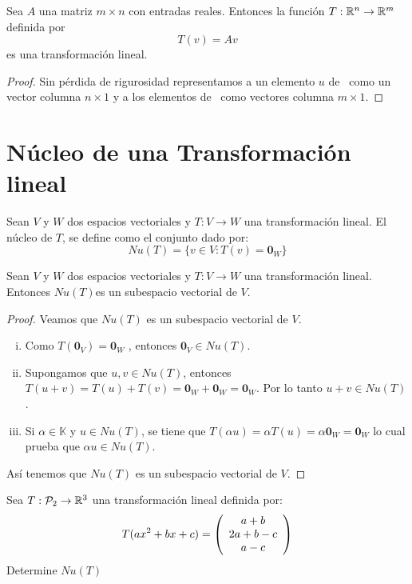 \begin{theorem}
Sea $A$ una matriz $m \times n$ con entradas reales. Entonces la función $T : \mathbb{R}^n \to \mathbb{R}^m $ definida por $$T(v)= A v$$
es una transformación lineal.
\end{theorem}

\begin{proof}
Sin pérdida de rigurosidad representamos a un elemento $u$ de \rn \ como un vector columna $n \times 1$ y a los elementos de \rmm \ como vectores columna $m \times 1$.
\end{proof}


\section{Núcleo de una Transformación lineal}
\begin{dfn}
Sean $V$ y $W$ dos espacios vectoriales y $T : V \to W$ una transformación lineal. El núcleo de $T$, se define como el conjunto dado por: 
$$Nu(T) = \{v \in V : T(v) = \mathbf{0}_W\}$$
\end{dfn}

\begin{theorem}
Sean $V$ y $W$ dos espacios vectoriales y $T : V \to W$ una transformación lineal. Entonces $Nu(T)$es un subespacio vectorial de $V$.
\end{theorem}

\begin{proof}
Veamos que $Nu(T)$ es un subespacio vectorial de $V$.
\begin{enumerate}[i.]
\item Como $T(\mathbf{0}_V)=\mathbf{0}_W$ , entonces $\mathbf{0}_V \in Nu(T)$.
\item Supongamos que $u , v \in Nu(T)$, entonces $T(u+v) = T(u) + T(v) = \mathbf{0}_W + \mathbf{0}_W = \mathbf{0}_W$. Por lo tanto $u+v \in Nu(T)$.
\item Si $\alpha \in \mathbb{K}$ y $u \in Nu(T)$, se tiene que $T(\alpha u) = \alpha T(u) = \alpha \mathbf{0}_W = \mathbf{0}_W$ lo cual prueba que $\alpha u \in Nu(T)$.
\end{enumerate}
Así tenemos que $Nu(T)$ es un subespacio vectorial de $V$.
\end{proof}

\begin{ejemplo}
Sea $T: \mathcal{P}_2 \to \mathbb{R}^3$ una transformación lineal definida por:
$$T(ax^2 + bx + c) = \left( \begin{array}{c} a+b\\ 2a+b-c\\ a-c \end{array} \right) $$
Determine $Nu(T)$
\end{ejemplo}

